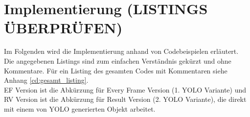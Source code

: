 \chapter{Implementierung (LISTINGS ÜBERPRÜFEN)} 
\label{ch:implementierung}


{\label{implementation_in_python}} 
Im Folgenden wird die Implementierung anhand von Codebeispielen erläutert. Die angegebenen Listings sind zum einfachen Verständnis gekürzt und ohne Kommentare. Für ein Listing des gesamten Codes mit Kommentaren siehe Anhang \ref{cd:gesamt_listing}. \\ 
EF Version ist die Abkürzung für \glqq Every Frame\grqq{} Version (1. YOLO Variante) und RV Version ist die Abkürzung für \glqq Result\grqq{} Version (2. YOLO Variante), die direkt mit einem von YOLO generierten Objekt arbeitet. 
